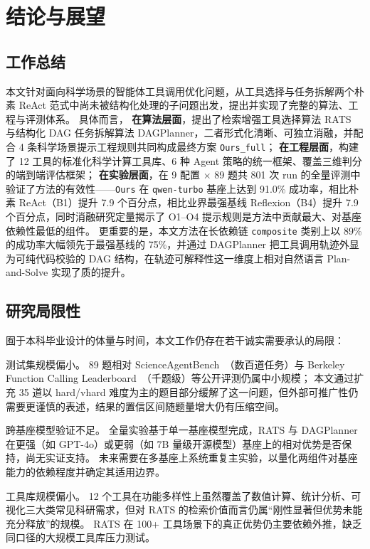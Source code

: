 \clearpage

\section{结论与展望}

\subsection{工作总结}

本文针对面向科学场景的智能体工具调用优化问题，从工具选择与任务拆解两个朴素 ReAct 范式中尚未被结构化处理的子问题出发，提出并实现了完整的算法、工程与评测体系。
具体而言，
\textbf{在算法层面}，提出了检索增强工具选择算法 RATS 与结构化 DAG 任务拆解算法 DAGPlanner，二者形式化清晰、可独立消融，并配合 4 条科学场景提示工程规则共同构成最终方案 \texttt{Ours\_full}；
\textbf{在工程层面}，构建了 12 工具的标准化科学计算工具库、6 种 Agent 策略的统一框架、覆盖三维判分的端到端评估框架；
\textbf{在实验层面}，在 9 配置 $\times$ 89 题共 801 次 run 的全量评测中验证了方法的有效性——\texttt{Ours} 在 \texttt{qwen-turbo} 基座上达到 91.0\% 成功率，相比朴素 ReAct（B1）提升 7.9 个百分点，相比业界最强基线 Reflexion（B4）提升 7.9 个百分点，同时消融研究定量揭示了 O1--O4 提示规则是方法中贡献最大、对基座依赖性最低的组件。
更重要的是，本文方法在长依赖链 \texttt{composite} 类别上以 89\% 的成功率大幅领先于最强基线的 75\%，并通过 DAGPlanner 把工具调用轨迹外显为可纯代码校验的 DAG 结构，在轨迹可解释性这一维度上相对自然语言 Plan-and-Solve 实现了质的提升。

\subsection{研究局限性}

囿于本科毕业设计的体量与时间，本文工作仍存在若干诚实需要承认的局限：

测试集规模偏小。
89 题相对 ScienceAgentBench~\cite{chen2024scienceagentbench}（数百道任务）与 Berkeley Function Calling Leaderboard~\cite{bfcl2024}（千题级）等公开评测仍属中小规模；
本文通过扩充 35 道以 hard/vhard 难度为主的题目部分缓解了这一问题，但外部可推广性仍需要更谨慎的表述，结果的置信区间随题量增大仍有压缩空间。

跨基座模型验证不足。
全量实验基于单一基座模型完成，RATS 与 DAGPlanner 在更强（如 GPT-4o）或更弱（如 7B 量级开源模型）基座上的相对优势是否保持，尚无实证支持。
未来需要在多基座上系统重复主实验，以量化两组件对基座能力的依赖程度并确定其适用边界。

工具库规模偏小。
12 个工具在功能多样性上虽然覆盖了数值计算、统计分析、可视化三大类常见科研需求，但对 RATS 的检索价值而言仍属“刚性显著但优势未能充分释放”的规模。
RATS 在 100+ 工具场景下的真正优势仍主要依赖外推，缺乏同口径的大规模工具库压力测试。

